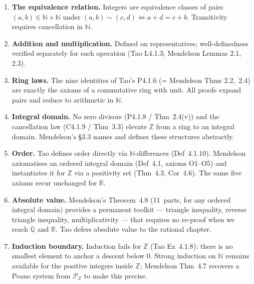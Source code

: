 \begin{enumerate}
  \item \textbf{The equivalence relation.}
        Integers are equivalence classes of pairs $(a,b)\in\mathbb{N}
        \times\mathbb{N}$ under $(a,b)\sim(c,d)\iff a+d=c+b$.
        Transitivity requires cancellation in $\mathbb{N}$.

  \item \textbf{Addition and multiplication.}
        Defined on representatives; well-definedness verified separately
        for each operation (Tao L4.1.3; Mendelson Lemmas 2.1, 2.3).

  \item \textbf{Ring laws.}
        The nine identities of Tao's P4.1.6 (= Mendelson Thms 2.2,~2.4)
        are exactly the axioms of a commutative ring with unit.
        All proofs expand pairs and reduce to arithmetic in $\mathbb{N}$.

  \item \textbf{Integral domain.}
        No zero divisors (P4.1.8 / Thm~2.4(v)) and the cancellation law
        (C4.1.9 / Thm~3.3) elevate $\mathbb{Z}$ from a ring to an
        integral domain.
        Mendelson's \S3.3 names and defines these structures abstractly.

  \item \textbf{Order.}
        Tao defines order directly via $\mathbb{N}$-differences
        (Def~4.1.10).
        Mendelson axiomatises an ordered integral domain (Def~4.1,
        axioms O1--O5) and instantiates it for $\mathbb{Z}$ via a
        positivity set (Thm~4.3, Cor~4.6).
        The same five axioms recur unchanged for $\mathbb{R}$.

  \item \textbf{Absolute value.}
        Mendelson's Theorem~4.8 (11~parts, for any ordered integral
        domain) provides a permanent toolkit ---
        triangle inequality, reverse triangle inequality, multiplicativity
        --- that requires no re-proof when we reach $\mathbb{Q}$ and
        $\mathbb{R}$.
        Tao defers absolute value to the rational chapter.

  \item \textbf{Induction boundary.}
        Induction fails for $\mathbb{Z}$ (Tao Ex~4.1.8): there is no
        smallest element to anchor a descent below $0$.
        Strong induction on $\mathbb{N}$ remains available for the
        positive integers inside $\mathbb{Z}$; Mendelson Thm~4.7 recovers
        a Peano system from $\mathcal{P}_{\mathbb{Z}}$ to make this
        precise.
\end{enumerate}
